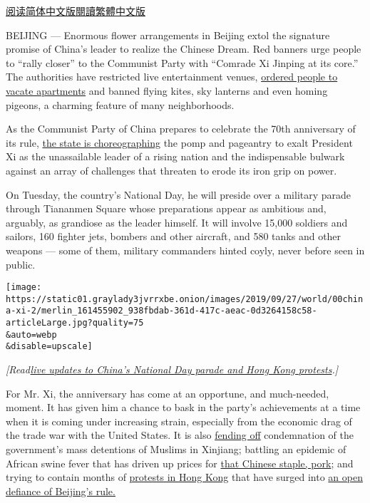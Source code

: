 \href{https://cn.nytimes3xbfgragh.onion/china/20190930/china-national-day-70th-anniversary/}{阅读简体中文版}\href{https://cn.nytimes3xbfgragh.onion/china/20190930/china-national-day-70th-anniversary/zh-hant/}{閱讀繁體中文版}

BEIJING --- Enormous flower arrangements in Beijing extol the signature
promise of China's leader to realize the Chinese Dream. Red banners urge
people to ``rally closer'' to the Communist Party with ``Comrade Xi
Jinping at its core.'' The authorities have restricted live
entertainment venues,
\href{https://www.nytimes3xbfgragh.onion/2019/09/23/world/asia/china-xi-jinping-communist-party-70th-anniversary.html}{ordered
people to vacate apartments} and banned flying kites, sky lanterns and
even homing pigeons, a charming feature of many neighborhoods.

As the Communist Party of China prepares to celebrate the 70th
anniversary of its rule,
\href{https://www.nytimes3xbfgragh.onion/2019/09/30/world/asia/china-national-day-hong-kong-protests.html}{the
state is choreographing} the pomp and pageantry to exalt President Xi as
the unassailable leader of a rising nation and the indispensable bulwark
against an array of challenges that threaten to erode its iron grip on
power.

On Tuesday, the country's National Day, he will preside over a military
parade through Tiananmen Square whose preparations appear as ambitious
and, arguably, as grandiose as the leader himself. It will involve
15,000 soldiers and sailors, 160 fighter jets, bombers and other
aircraft, and 580 tanks and other weapons --- some of them, military
commanders hinted coyly, never before seen in public.

\texttt{[image: https://static01.graylady3jvrrxbe.onion/images/2019/09/27/world/00china-xi-2/merlin\_161455902\_938fbdab-361d-417c-aeac-0d3264158c58-articleLarge.jpg?quality=75\\\&auto=webp\\\&disable=upscale]}

\emph{{[}Read\href{https://www.nytimes3xbfgragh.onion/2019/09/30/world/asia/china-national-day-hong-kong-protests.html?module=inline}{live
updates to China's National Day parade and Hong Kong protests}.{]}}

For Mr. Xi, the anniversary has come at an opportune, and much-needed,
moment. It has given him a chance to bask in the party's achievements at
a time when it is coming under increasing strain, especially from the
economic drag of the trade war with the United States. It is also
\href{https://www.nytimes3xbfgragh.onion/2019/09/21/world/asia/china-islam-crackdown.html}{fending
off} condemnation of the government's mass detentions of Muslims in
Xinjiang; battling an epidemic of African swine fever that has driven up
prices for
\href{https://www.nytimes3xbfgragh.onion/2019/09/10/business/china-pork-prices.html}{that
Chinese staple, pork}; and trying to contain months of
\href{https://www.nytimes3xbfgragh.onion/2019/09/28/world/asia/hong-kong-protests-china.html}{protests
in Hong Kong} that have surged into
\href{https://www.nytimes3xbfgragh.onion/2019/09/27/world/asia/hong-kong-protests-identity.html}{an
open defiance of Beijing's rule.}

